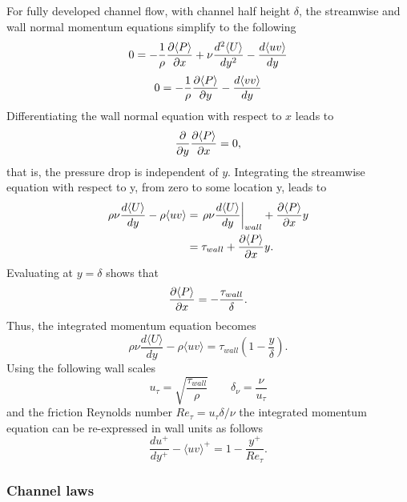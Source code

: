\documentclass[oneside,a4paper,11pt]{report}
\begin{document}
For fully developed channel flow, with channel half height $\delta$, the streamwise and wall normal momentum equations simplify to the following
\begin{equation}
0 = -\frac{1}{\rho}\frac{\partial \langle P \rangle}{\partial x} + \nu \frac{d^2 \langle U \rangle}{d y^2} - \frac{d \langle uv \rangle}{d y}
\end{equation}
\begin{equation}
0 = -\frac{1}{\rho}\frac{\partial \langle P \rangle}{\partial y} - \frac{d \langle vv \rangle}{d y}
\end{equation}
Differentiating the wall normal equation with respect to $x$ leads to
\begin{equation}
\frac{\partial}{\partial y} \frac{\partial \langle P \rangle}{\partial x} = 0,
\end{equation}
that is, the pressure drop is independent of $y$. Integrating the streamwise equation with respect to y, from zero to some location y, leads to
\begin{align}
\rho \nu \frac{d \langle U \rangle}{d y} - \rho\langle uv \rangle &= \left . \rho \nu \frac{d \langle U \rangle}{d y} \right |_{wall} + \frac{\partial \langle P \rangle}{\partial x} y \nonumber \\
& = \tau_{wall} + \frac{\partial \langle P \rangle}{\partial x} y.
\end{align}
Evaluating at $y = \delta$ shows that
\begin{equation}
\frac{\partial \langle P \rangle}{\partial x} = -\frac{\tau_{wall}}{\delta}.
\end{equation}
Thus, the integrated momentum equation becomes
\begin{equation}
\rho \nu \frac{d \langle U \rangle}{d y} - \rho\langle uv \rangle = \tau_{wall} \left ( 1 - \frac{y}{\delta} \right ).
\end{equation}
Using the following wall scales
\begin{equation}
u_\tau = \sqrt{\frac{\tau_{wall}}{\rho}} \qquad \delta_\nu = \frac{\nu}{u_\tau} 
\end{equation}
and the friction Reynolds number $Re_\tau = u_\tau \delta/\nu$ the integrated momentum equation can be re-expressed in wall units as follows
\begin{equation}
\frac{du^+}{dy^+} - \langle uv \rangle^+ = 1 - \frac{y^+}{Re_\tau}.
\end{equation}

\subsubsection{Channel laws}
\end{document}
